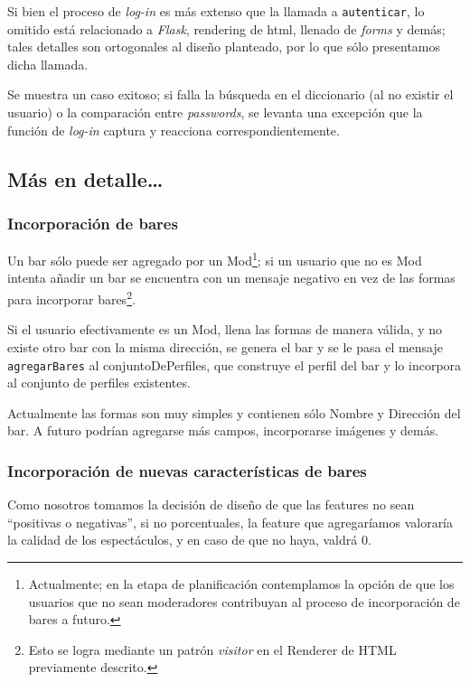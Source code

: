 \par Si bien el proceso de \textit{log-in} es más extenso que la llamada a \texttt{autenticar}, lo omitido está relacionado a \textit{Flask}, rendering de html, llenado de \textit{forms} y demás; tales detalles son ortogonales al diseño planteado, por lo que sólo presentamos dicha llamada.

\par Se muestra un caso exitoso; si falla la búsqueda en el diccionario (al no existir el usuario) o la comparación entre \textit{passwords}, se levanta una excepción que la función de \textit{log-in} captura y reacciona correspondientemente.

\subsection{Más en detalle\ldots}

\subsubsection{Incorporación de bares}

\par Un bar sólo puede ser agregado por un Mod\footnote{Actualmente; en la etapa de planificación contemplamos la opción de que los usuarios que no sean moderadores contribuyan al proceso de incorporación de bares a futuro.}; si un usuario que no es Mod intenta añadir un bar se encuentra con un mensaje negativo en vez de las formas para incorporar bares\footnote{Esto se logra mediante un patrón \textit{visitor} en el Renderer de HTML previamente descrito.}.

\par Si el usuario efectivamente es un Mod, llena las formas de manera válida, y no existe otro bar con la misma dirección, se genera el bar y se le pasa el mensaje \texttt{agregarBares} al conjuntoDePerfiles, que construye el perfil del bar y lo incorpora al conjunto de perfiles existentes.

\par Actualmente las formas son muy simples y contienen sólo Nombre y Dirección del bar.
A futuro podrían agregarse más campos, incorporarse imágenes y demás.

\subsubsection{Incorporación de nuevas características de bares}

Como nosotros tomamos la decisión de diseño de que las features no sean ``positivas o negativas'', si no porcentuales, la feature que agregaríamos valoraría la calidad de los espectáculos, y en caso de que no haya, valdrá 0.

